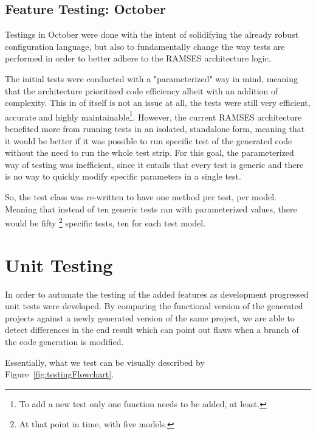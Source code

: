 \subsection{Feature Testing: October}
\label{sec:test_feature_two}

Testings in October were done with the intent of solidifying the already robust configuration language, but also to fundamentally change the way tests are performed in order to better adhere to the \gls{RAMSES} architecture logic.

The initial tests were conducted with a "parameterized" way in mind, meaning that the architecture prioritized code efficiency albeit with an addition of complexity. This in of itself is not an issue at all, the tests were still very efficient, accurate and highly maintainable\footnote{To add a new test only one function needs to be added, at least.}. However, the current \gls{RAMSES} architecture benefited more from running tests in an isolated, standalone form, meaning that it would be better if it was possible to run specific test of the generated code without the need to run the whole test strip. For this goal, the parameterized way of testing was inefficient, since it entails that every test is generic and there is no way to quickly modify specific parameters in a single test.

So, the test class was re-written to have one method per test, per model. Meaning that instead of ten generic tests ran with parameterized values, there would be fifty \footnote{At that point in time, with five models.} specific tests, ten for each test model.


\section{Unit Testing}
\label{sec:test_unit}

In order to automate the testing of the added features as development progressed unit tests were developed. By comparing the functional version of the generated projects against a newly generated version of the same project, we are able to detect differences in the end result which can point out flaws when a branch of the code generation is modified. 

Essentially, what we test can be visually described by Figure~\ref{fig:testingFlowchart}.

